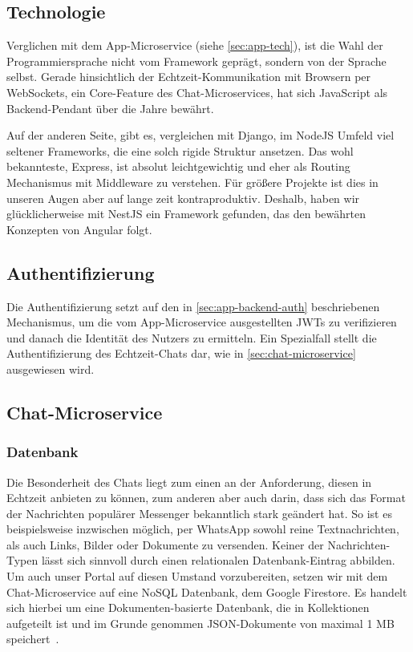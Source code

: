 \documentclass{article}
\begin{document}
\subsection{Technologie}

Verglichen mit dem App-Microservice (siehe \autoref{sec:app-tech}), ist die Wahl der Programmiersprache nicht vom Framework geprägt, sondern von der Sprache selbst. Gerade hinsichtlich der Echtzeit-Kommunikation mit Browsern per WebSockets, ein Core-Feature des Chat-Microservices, hat sich JavaScript als Backend-Pendant über die Jahre bewährt. 

Auf der anderen Seite, gibt es, vergleichen mit Django, im NodeJS Umfeld viel seltener Frameworks, die eine solch rigide Struktur ansetzen. Das wohl bekannteste, Express, ist absolut leichtgewichtig und eher als Routing Mechanismus mit Middleware zu verstehen. Für größere Projekte ist dies in unseren Augen aber auf lange zeit kontraproduktiv. Deshalb, haben wir glücklicherweise mit NestJS ein Framework gefunden, das den bewährten Konzepten von Angular folgt. 

\subsection{Authentifizierung}

Die Authentifizierung setzt auf den in \autoref{sec:app-backend-auth} beschriebenen Mechanismus, um die vom App-Microservice ausgestellten JWTs zu verifizieren und danach die Identität des Nutzers zu ermitteln. Ein Spezialfall stellt die Authentifizierung des Echtzeit-Chats dar, wie in \autoref{sec:chat-microservice} ausgewiesen wird.



\subsection{Chat-Microservice}
\label{sec:chat-microservice}



\subsubsection{Datenbank}

Die Besonderheit des Chats liegt zum einen an der Anforderung, diesen in Echtzeit anbieten zu können, zum anderen aber auch darin, dass sich das Format der Nachrichten populärer Messenger bekanntlich stark geändert hat. So ist es beispielsweise inzwischen möglich, per WhatsApp sowohl reine Textnachrichten, als auch Links, Bilder oder Dokumente zu versenden. Keiner der Nachrichten-Typen lässt sich sinnvoll durch einen relationalen Datenbank-Eintrag abbilden. Um auch unser Portal auf diesen Umstand vorzubereiten, setzen wir mit dem Chat-Microservice auf eine NoSQL Datenbank, dem Google Firestore. Es handelt sich hierbei um eine Dokumenten-basierte Datenbank, die in Kollektionen aufgeteilt ist und im Grunde genommen JSON-Dokumente von maximal 1 MB speichert~\cite{firestore-json}. 
\end{document}
